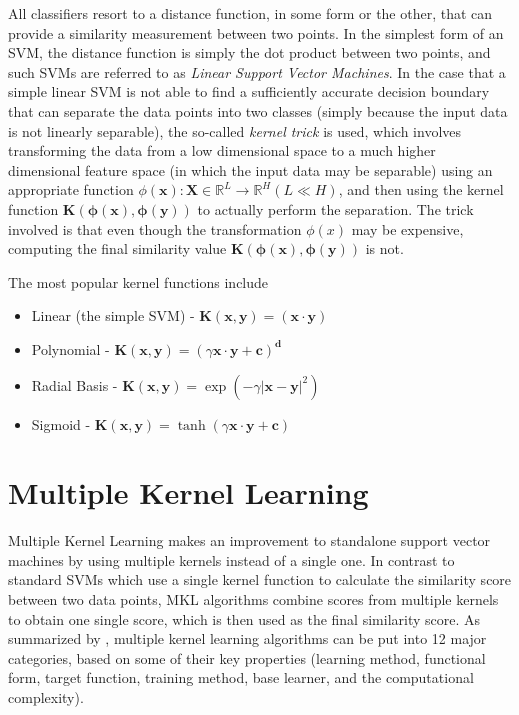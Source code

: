 All classifiers resort to a distance function, in some form or the other, that can provide a similarity measurement between two points. In the simplest form of an SVM, the distance function is simply the dot product between two points, and such SVMs are referred to as \emph{Linear Support Vector Machines}. In the case that a simple linear SVM is not able to find a sufficiently accurate decision boundary that can separate the data points into two classes (simply because the input data is not linearly separable), the so-called \emph{kernel trick} is used, which involves transforming the data from a low dimensional space to a much higher dimensional feature space (in which the input data may be separable) using an appropriate function $\phi(\mathbf{x}): \mathbf{X} \in \mathbb{R}^{L} \rightarrow \mathbb{R}^H (L \ll H)$, and then using the kernel function $\mathbf{K(\phi(x), \phi(y))}$ to actually perform the separation. The trick involved is that even though the transformation $\phi(x)$ may be expensive, computing the final similarity value $\mathbf{K(\phi(x), \phi(y))}$ is not.

The most popular kernel functions include
\begin{itemize}
    \item{Linear (the simple SVM) - $\mathbf{K(x, y)} = (\mathbf{x} \cdot \mathbf{y})$ }
    \item{Polynomial - $\mathbf{K(x, y)} = (\gamma \mathbf{x} \cdot \mathbf{y} + \mathbf{c})^{\mathbf{d}}$}
    \item{Radial Basis - $\mathbf{K(x, y)} = \exp(-\gamma {| \mathbf{x} - \mathbf{y} |}^{2})$}
    \item{Sigmoid - $\mathbf{K(x, y)} = \tanh(\gamma \mathbf{x} \cdot \mathbf{y} + \mathbf{c})$}
\end{itemize}

\section{Multiple Kernel Learning}
Multiple Kernel Learning makes an improvement to standalone support vector machines by using multiple kernels instead of a single one. In contrast to standard SVMs which use a single kernel function to calculate the similarity score between two data points, MKL algorithms combine scores from multiple kernels to obtain one single score, which is then used as the final similarity score. As summarized by \cite{gonen11a}, multiple kernel learning algorithms can be put into 12 major categories, based on some of their key properties (learning method, functional form, target function, training method, base learner, and the computational complexity).

